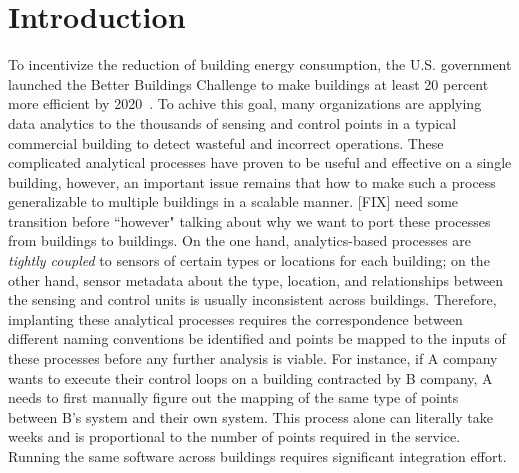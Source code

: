 \section{Introduction}

To incentivize the reduction of building energy consumption, the U.S. government 
launched the Better Buildings Challenge to make buildings at least 20 percent 
more efficient by 2020~\cite{doe2013better}. To achive this goal, many organizations 
are applying data analytics to the thousands of sensing and control points in 
a typical commercial building to detect wasteful and incorrect operations. These 
complicated analytical processes have proven to be useful and effective on 
a single building, however, an important issue remains that how to make such a process 
generalizable to multiple buildings in a scalable manner. [FIX] need some transition 
before ``however" talking about why we want to port these processes from buildings 
to buildings. On the one hand, analytics-based processes are \emph{tightly coupled} 
to sensors of certain types or locations for each building; on the other hand, 
sensor metadata about the type, location, and relationships between the sensing 
and control units is usually inconsistent across buildings. Therefore, implanting 
these analytical processes requires the correspondence between different naming 
conventions be identified and points be mapped to the inputs of these processes 
before any further analysis is viable. For instance, if A company wants to execute their 
control loops on a building contracted by B company, A needs to first manually 
figure out the mapping of the same type of points between B's system and 
their own system. This process alone can literally take weeks and is proportional 
to the number of points required in the service. Running the same software across 
buildings requires significant integration effort.


